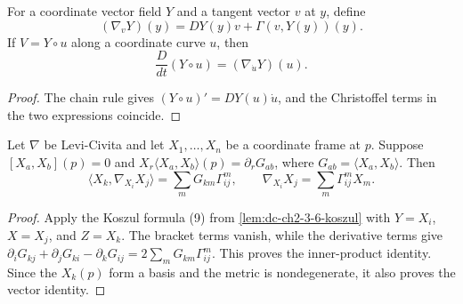\begin{lemma}
  \label{lem:dc-ch2-2-2-c-coord}
  \leanok
  For a coordinate vector field $Y$ and a tangent vector $v$ at $y$, define
  \[
    (\nabla_vY)(y)=DY(y)v+\Gamma(v,Y(y))(y).
  \]
  If $V=Y\circ u$ along a coordinate curve $u$, then
  \[
    \frac{D}{dt}(Y\circ u)=(\nabla_{\dot u}Y)(u).
  \]
\end{lemma}
\begin{proof}
  \leanok
  \sketch
  The chain rule gives $(Y\circ u)'=DY(u)\dot u$, and the Christoffel terms in
  the two expressions coincide.
\end{proof}

\begin{lemma}
  \label{lem:dc-ch2-2-2-c-formula10}
  \leanok
  Let $\nabla$ be Levi-Civita and let $X_1,\dots,X_n$ be a coordinate frame at
  $p$. Suppose $[X_a,X_b](p)=0$ and
  $X_r\langle X_a,X_b\rangle(p)=\partial_rG_{ab}$, where
  $G_{ab}=\langle X_a,X_b\rangle$. Then
  \[
    \langle X_k,\nabla_{X_i}X_j\rangle
      =\sum_mG_{km}\Gamma^m_{ij},
    \qquad
    \nabla_{X_i}X_j=\sum_m\Gamma^m_{ij}X_m.\tag{10}
  \]
  \end{lemma}
\begin{proof}
    \leanok
    \sketch
    Apply the Koszul formula (9) from \cref{lem:dc-ch2-3-6-koszul} with
    $Y=X_i$, $X=X_j$, and $Z=X_k$. The bracket terms vanish, while the derivative
    terms give
    $\partial_iG_{kj}+\partial_jG_{ki}-\partial_kG_{ij}
      =2\sum_mG_{km}\Gamma^m_{ij}$.
    This proves the inner-product identity. Since the $X_k(p)$ form a basis and
    the metric is nondegenerate, it also proves the vector identity.
  \end{proof}

